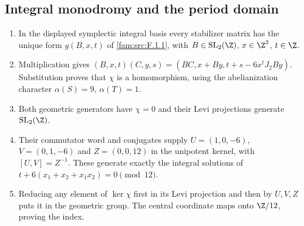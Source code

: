 \subsection{Integral monodromy and the period domain}
\RungOne
\begin{enumerate}[label=\arabic*.]
\item In the displayed symplectic integral basis every stabilizer
matrix has the unique form $g(B,x,t)$ of
\ref{fam:src:F.1.1}, with $B\in\operatorname{SL}_2(\Z)$,
$x\in\Z^2$, $t\in\Z$.
\item Multiplication gives
$(B,x,t)(C,y,s)=(BC,x+By,t+s-6x^tJ_2By)$.
Substitution proves that $\chi$ is a homomorphism, using the
abelianization character $\alpha(S)=9$, $\alpha(T)=1$.
\item Both geometric generators have $\chi=0$ and their Levi
projections generate $\operatorname{SL}_2(\Z)$.
\item Their commutator word and conjugates supply
$U=(1,0,-6)$, $V=(0,1,-6)$ and $Z=(0,0,12)$ in the unipotent
kernel, with $[U,V]=Z^{-1}$. These generate exactly the
integral solutions of $t+6(x_1+x_2+x_1x_2)=0\pmod{12}$.
\item Reducing any element of $\ker\chi$ first in its Levi
projection and then by $U,V,Z$ puts it in the geometric group.
The central coordinate maps onto $\Z/12$, proving the index.
\end{enumerate}

